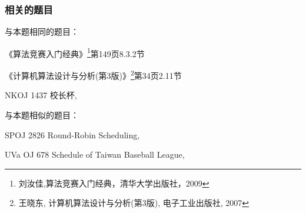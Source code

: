 \subsubsection{相关的题目}
与本题相同的题目：
\begindot
\item 《算法竞赛入门经典》\footnote{刘汝佳,算法竞赛入门经典，清华大学出版社，2009}第149页8.3.2节
\item 《计算机算法设计与分析(第3版)》\footnote{王晓东, 计算机算法设计与分析(第3版), 电子工业出版社, 2007}第34页2.11节
\item NKOJ 1437 校长杯, 
\myenddot

与本题相似的题目：
\begindot
\item SPOJ 2826 Round-Robin Scheduling, 
\item UVa OJ 678 Schedule of Taiwan Baseball League, 
\myenddot
